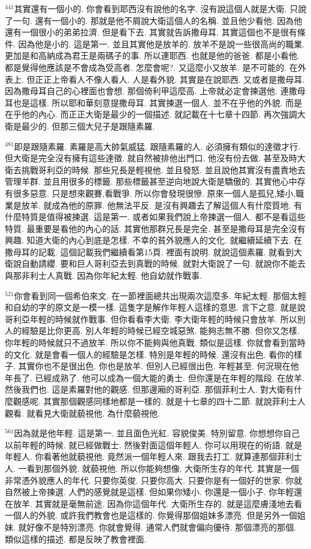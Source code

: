 \documentclass{book}
\begin{document}
$^{441}$其實還有一個小的.
你會看到耶西沒有說他的名字.
沒有說這個人就是大衛.
只說了一句.
還有一個小的.
那就是他不屑說大衛這個人的名稱.
並且他少看他.
因為他還有一個很小的弟弟拉濟.
但是看下去.
其實就告訴撒母耳.
其實這個也不是很有條件.
因為他是小的.
這是第一.
並且其實他是放羊的.
放羊不是說一些很高尚的職業.
更加是和高納成為君王是兩碼子的事.
所以連耶西.
也就是他的爸爸.
都是小看他.
都是覺得他應該是不會成為受高者.
怎麼會呢?.
又這麼小又放羊.
是不可能的.
在外表上.
但正正上帝看人不像人看人.
人是看外貌.
其實是在說耶西.
又或者是撒母耳.
因為撒母耳自己的心裡面也會想.
那個倚利甲這麼高.
上帝就必定會揀選他.
連撒母耳也是這樣.
所以耶和華刻意提撒母耳.
其實揀選一個人.
並不在乎他的外貌.
而是在乎他的內心.
而正正大衛是最少的一個描述.
就記載在十七章十四節.
再次強調大衛是最少的.
但那三個大兒子是跟隨素羅.

$^{481}$即是跟隨素羅.
素羅是高大帥氣威猛.
跟隨素羅的人.
必須擁有類似的達徵才行.
但大衛是完全沒有擁有這些達徵.
就自然被排他出門口.
他沒有份去做.
甚至及時大衛去挑戰哥利亞的時候.
那些兄長是輕視他.
並且發怒.
並且說他其實沒有盡責地去管理羊群.
並且用很多的標籤.
那些標籤甚至逆向地說大衛是驕傲的.
其實他心中存有很多惡意.
只是想來觀賽,看戰爭.
所以你會發現很慘.
原來一個人是孤兒,矮小,職業是放羊.
就成為他的原罪.
他無法平反.
是沒有興趣去了解這個人有什麼質地.
有什麼特質是值得被揀選.
這是第一.
或者如果我們說上帝揀選一個人.
都不是看這些特質.
最重要是看他的內心的話.
其實他那群兄長是完全.
甚至是撒母耳是完全沒有興趣.
知道大衛的內心到底是怎樣.
不幸的貧外貌應人的文化.
就繼續延續下去.
在撒母耳的記載.
這個記載我們繼續看第15頁.
裡面有說明.
就說這個素羅.
就看到大衛說自動請纓.
要和巨人哥利亞去到真戰的時候.
就對大衛說了一句.
就說你不能去與那非利士人真戰.
因為你年紀太輕.
他自幼就作戰事.

$^{521}$你會看到同一個希伯來文.
在一節裡面總共出現兩次這麼多.
年紀太輕.
那個太輕和自幼的字的原文是一模一樣.
這隻字是解作年輕人這樣的意思.
言下之意.
就是說哥利亞年輕的時候就作戰事.
但你看看李大衛.
李大衛年輕的時候只會放羊.
所以別人的經驗是比你更高.
別人年輕的時候已經空城惡煞.
能夠志無不勝.
但你又怎樣.
你年輕的時候就只不過放羊.
所以你不能夠與他真戰.
類似是這樣.
你就會看到當時的文化.
就是會看一個人的經驗是怎樣.
特別是年輕的時候.
還沒有出色.
看你的樣子.
其實你也不是很出色.
你也是放羊.
但別人已經很出色.
年輕甚至.
何況現在他年長了.
已經成熟了.
他可以成為一個大能的勇士.
但你還是在年輕的階段.
在放羊.
然後我們也.
這是素羅對他的觀感.
但那邊廂的哥利亞.
那個菲利士人.
對大衛有什麼觀感呢.
其實那個觀感同樣地都是一樣的.
就是十七章的四十二節.
就說菲利士人觀看.
就看見大衛就藐視他.
為什麼藐視他.

$^{561}$因為就是他年輕.
這是第一.
並且面色光紅.
容貌俊美.
特別留意.
你想想你自己以前年輕的時候.
就已經做戰士.
然後對面這個年輕人.
你可以用現在的術語.
就是年輕人.
你看著他就藐視他.
竟然派一個年輕人來.
跟我去打工.
就算連那個菲利士人.
一看到那個外貌.
就藐視他.
所以你能夠想像.
大衛所生存的年代.
其實是一個非常憑外貌應人的年代.
只要你英俊.
只要你高大.
只要你是有一個好的世家.
你就自然被上帝揀選.
人們的感覺就是這樣.
但如果你矮小.
你還是一個小子.
你年輕還在放羊.
其實就是毫無前途.
因為你這個年代.
大衛所生存的.
就是這麼膚淺地去看一個人的外貌.
或許我們教會也是這樣的.
你覺得那個姐妹多漂亮.
但是另外一個姐妹.
就好像不是特別漂亮.
你就會覺得.
通常人們就會偏向優待.
那個漂亮的那個.
類似這樣的描述.
都是反映了教會裡面.
\end{document}
